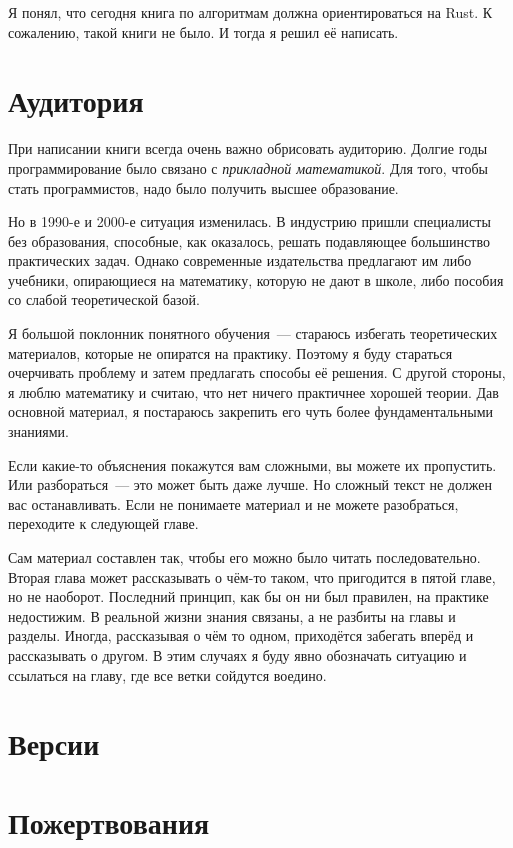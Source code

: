 Я понял, что сегодня книга по алгоритмам должна ориентироваться на Rust.
К сожалению, такой книги не было.
И тогда я решил её написать.

\section{Аудитория}

При написании книги всегда очень важно обрисовать аудиторию.
Долгие годы программирование было связано с {\em прикладной математикой}.
Для того, чтобы стать программистов, надо было получить высшее образование.

Но в 1990-е и 2000-е ситуация изменилась.
В индустрию пришли специалисты без образования, способные, как оказалось, решать подавляющее большинство практических задач.
Однако современные издательства предлагают им либо учебники, опирающиеся на математику, которую не дают в школе, либо пособия со слабой теоретической базой.

Я большой поклонник понятного обучения~--- стараюсь избегать теоретических материалов, которые не опиратся на практику.
Поэтому я буду стараться очерчивать проблему и затем предлагать способы её решения.
С другой стороны, я люблю математику и считаю, что нет ничего практичнее хорошей теории.
Дав основной материал, я постараюсь закрепить его чуть более фундаментальными знаниями.

Если какие-то объяснения покажутся вам сложными, вы можете их пропустить.
Или разбораться~--- это может быть даже лучше.
Но сложный текст не должен вас останавливать.
Если не понимаете материал и не можете разобраться, переходите к следующей главе.

Сам материал составлен так, чтобы его можно было читать последовательно.
Вторая глава может рассказывать о чём-то таком, что пригодится в пятой главе, но не наоборот.
Последний принцип, как бы он ни был правилен, на практике недостижим.
В реальной жизни знания связаны, а не разбиты на главы и разделы.
Иногда, рассказывая о чём то одном, приходётся забегать вперёд и рассказывать о другом.
В этим случаях я буду явно обозначать ситуацию и ссылаться на главу, где все ветки сойдутся воедино.

\section{Версии}

\section{Пожертвования}
